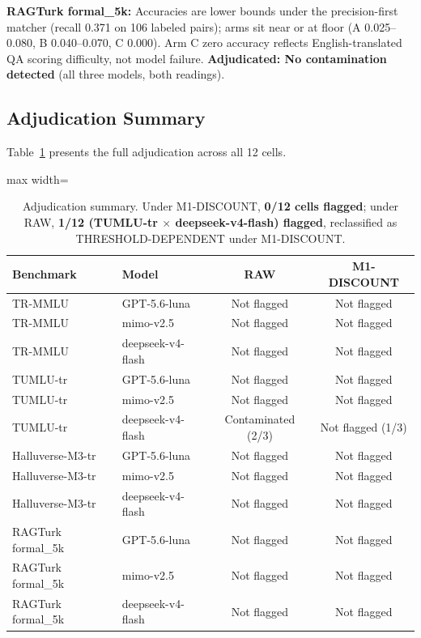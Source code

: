 \documentclass[letterpaper]{article}
\begin{document}
\textbf{RAGTurk formal\_5k:} Accuracies are lower bounds under the precision-first matcher (recall 0.371 on 106 labeled pairs); arms sit near or at floor (A 0.025--0.080, B 0.040--0.070, C 0.000). Arm C zero accuracy reflects English-translated QA scoring difficulty, not model failure. \textbf{Adjudicated: No contamination detected} (all three models, both readings).

\subsection{Adjudication Summary}
Table~\ref{tab:adjudication} presents the full adjudication across all 12 cells.

\begin{table}[t]
\centering
\begin{adjustbox}{max width=\textwidth}
\begin{tabular}{llcc}
\toprule
\textbf{Benchmark} & \textbf{Model} & \textbf{RAW} & \textbf{M1-DISCOUNT} \\
\midrule
TR-MMLU & GPT-5.6-luna & Not flagged & Not flagged \\
TR-MMLU & mimo-v2.5 & Not flagged & Not flagged \\
TR-MMLU & deepseek-v4-flash & Not flagged & Not flagged \\
TUMLU-tr & GPT-5.6-luna & Not flagged & Not flagged \\
TUMLU-tr & mimo-v2.5 & Not flagged & Not flagged \\
TUMLU-tr & deepseek-v4-flash & Contaminated (2/3) & Not flagged (1/3) \\
Halluverse-M3-tr & GPT-5.6-luna & Not flagged & Not flagged \\
Halluverse-M3-tr & mimo-v2.5 & Not flagged & Not flagged \\
Halluverse-M3-tr & deepseek-v4-flash & Not flagged & Not flagged \\
RAGTurk formal\_5k & GPT-5.6-luna & Not flagged & Not flagged \\
RAGTurk formal\_5k & mimo-v2.5 & Not flagged & Not flagged \\
RAGTurk formal\_5k & deepseek-v4-flash & Not flagged & Not flagged \\
\bottomrule
\end{tabular}%
\end{adjustbox}
\caption{Adjudication summary. Under M1-DISCOUNT, \textbf{0/12 cells flagged}; under RAW, \textbf{1/12 (TUMLU-tr $\times$ deepseek-v4-flash) flagged}, reclassified as THRESHOLD-DEPENDENT under M1-DISCOUNT.}
\label{tab:adjudication}
\end{table}
\end{document}
